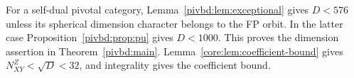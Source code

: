 For a self-dual pivotal category, Lemma~\ref{pivbd:lem:exceptional}
gives $D<576$ unless its spherical dimension character belongs to the
FP orbit. In the latter case Proposition~\ref{pivbd:prop:pu} gives
$D<1000$. This proves the dimension assertion in
Theorem~\ref{pivbd:main}.
Lemma~\ref{core:lem:coefficient-bound} gives $N_{XY}^{Z}<\sqrt D<32$,
and integrality gives the coefficient bound.


